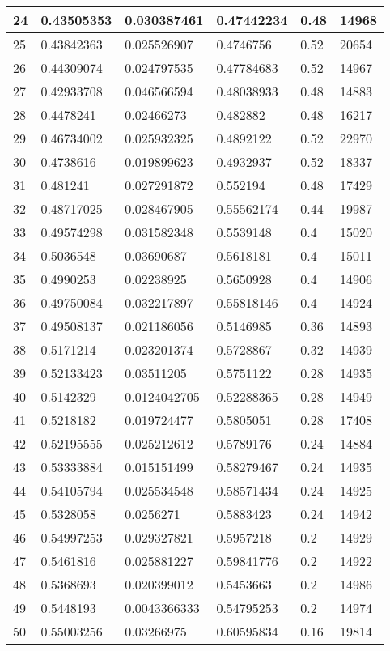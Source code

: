 \begin{longtable}{|l|l|l|l|l|l|}
24 & 0.43505353 & 0.030387461 & 0.47442234 & 0.48 & 14968 \\ \hline 
25 & 0.43842363 & 0.025526907 & 0.4746756 & 0.52 & 20654 \\ \hline 
26 & 0.44309074 & 0.024797535 & 0.47784683 & 0.52 & 14967 \\ \hline 
27 & 0.42933708 & 0.046566594 & 0.48038933 & 0.48 & 14883 \\ \hline 
28 & 0.4478241 & 0.02466273 & 0.482882 & 0.48 & 16217 \\ \hline 
29 & 0.46734002 & 0.025932325 & 0.4892122 & 0.52 & 22970 \\ \hline 
30 & 0.4738616 & 0.019899623 & 0.4932937 & 0.52 & 18337 \\ \hline 
31 & 0.481241 & 0.027291872 & 0.552194 & 0.48 & 17429 \\ \hline 
32 & 0.48717025 & 0.028467905 & 0.55562174 & 0.44 & 19987 \\ \hline 
33 & 0.49574298 & 0.031582348 & 0.5539148 & 0.4 & 15020 \\ \hline 
34 & 0.5036548 & 0.03690687 & 0.5618181 & 0.4 & 15011 \\ \hline 
35 & 0.4990253 & 0.02238925 & 0.5650928 & 0.4 & 14906 \\ \hline 
36 & 0.49750084 & 0.032217897 & 0.55818146 & 0.4 & 14924 \\ \hline 
37 & 0.49508137 & 0.021186056 & 0.5146985 & 0.36 & 14893 \\ \hline 
38 & 0.5171214 & 0.023201374 & 0.5728867 & 0.32 & 14939 \\ \hline 
39 & 0.52133423 & 0.03511205 & 0.5751122 & 0.28 & 14935 \\ \hline 
40 & 0.5142329 & 0.0124042705 & 0.52288365 & 0.28 & 14949 \\ \hline 
41 & 0.5218182 & 0.019724477 & 0.5805051 & 0.28 & 17408 \\ \hline 
42 & 0.52195555 & 0.025212612 & 0.5789176 & 0.24 & 14884 \\ \hline 
43 & 0.53333884 & 0.015151499 & 0.58279467 & 0.24 & 14935 \\ \hline 
44 & 0.54105794 & 0.025534548 & 0.58571434 & 0.24 & 14925 \\ \hline 
45 & 0.5328058 & 0.0256271 & 0.5883423 & 0.24 & 14942 \\ \hline 
46 & 0.54997253 & 0.029327821 & 0.5957218 & 0.2 & 14929 \\ \hline 
47 & 0.5461816 & 0.025881227 & 0.59841776 & 0.2 & 14922 \\ \hline 
48 & 0.5368693 & 0.020399012 & 0.5453663 & 0.2 & 14986 \\ \hline 
49 & 0.5448193 & 0.0043366333 & 0.54795253 & 0.2 & 14974 \\ \hline 
50 & 0.55003256 & 0.03266975 & 0.60595834 & 0.16 & 19814 \\ \hline 
\end{longtable}